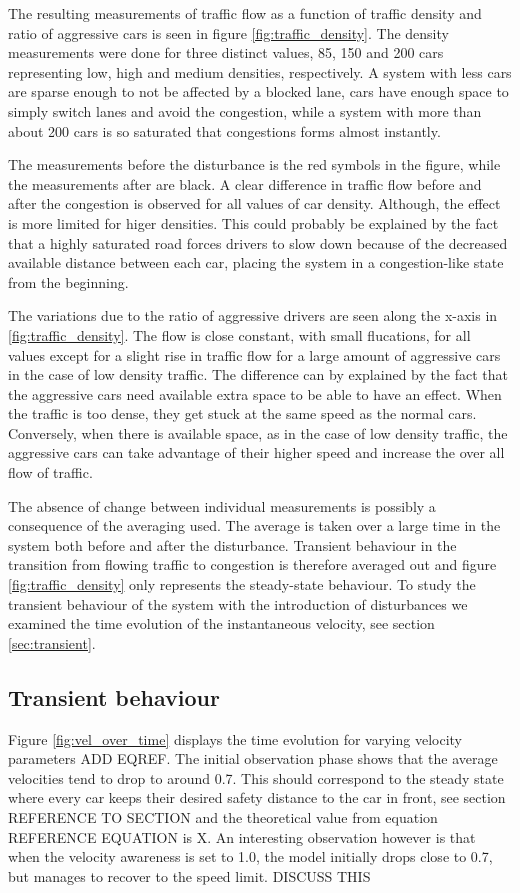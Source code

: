 \documentclass[11pt,a4paper,twocolumn]{article}
\begin{document}
 The resulting measurements of traffic flow as a function of traffic density and ratio of aggressive cars is seen in figure \ref{fig:traffic_density}. The density measurements were done for three distinct values, 85, 150 and 200 cars representing low, high and medium densities, respectively. A system with less cars are sparse enough to not be affected by a blocked lane, cars have enough space to simply switch lanes and avoid the congestion, while a system with more than about 200 cars is so saturated that congestions forms almost instantly.
 
 The measurements before the disturbance is the red symbols in the figure, while the measurements after are black. A clear difference in traffic flow before and after the congestion is observed for all values of car density. Although, the effect is more limited for higer densities. This could probably be explained by the fact that a highly saturated road forces drivers to slow down because of the decreased available distance between each car, placing the system in a congestion-like state from the beginning.

 The variations due to the ratio of aggressive drivers are seen along the x-axis in \ref{fig:traffic_density}. The flow is close constant, with small flucations, for all values except for a slight rise in traffic flow for a large amount of aggressive cars in the case of low density traffic. The difference can by explained by the fact that the aggressive cars need available extra space to be able to have an effect. When the traffic is too dense, they get stuck at the same speed as the normal cars. Conversely, when there is available space, as in the case of low density traffic, the aggressive cars can take advantage of their higher speed and increase the over all flow of traffic.  

 The absence of change between individual measurements is possibly a consequence of the averaging used. The average is taken over a large time in the system both before and after the disturbance. Transient behaviour in the transition from flowing traffic to congestion is therefore averaged out and figure \ref{fig:traffic_density} only represents the steady-state behaviour. To study the transient behaviour of the system with the introduction of disturbances we examined the time evolution of the instantaneous velocity, see section \ref{sec:transient}. 

\subsection{Transient behaviour}
Figure \ref{fig:vel_over_time} displays the time evolution for varying velocity parameters ADD EQREF. The initial observation phase shows that the average velocities tend to drop to around 0.7.
This should correspond to the steady state where every car keeps their desired safety distance to the car in front, see section REFERENCE TO SECTION and the theoretical value from equation REFERENCE EQUATION is X.
An interesting observation however is that when the velocity awareness is set to 1.0, the model initially drops close to 0.7, but manages to recover to the speed limit. DISCUSS THIS
\end{document}
